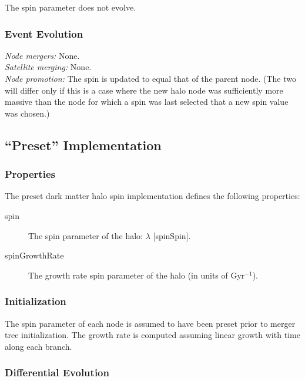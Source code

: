 The spin parameter does not evolve.

\subsubsection{Event Evolution}

\noindent\emph{Node mergers:} None.\\

\noindent\emph{Satellite merging:} None.\\

\noindent\emph{Node promotion:} The spin is updated to equal that of the parent node. (The two will differ only if this is a case where the new halo \gls{node} was sufficiently more massive than the \gls{node} for which a spin was last selected that a new spin value was chosen.)\\

\subsection{``Preset'' Implementation}

\subsubsection{Properties}

The preset dark matter halo spin implementation defines the following properties:
\begin{description}
 \item [{\normalfont \ttfamily spin}] The spin parameter of the halo: $\lambda$ [{\normalfont \ttfamily spinSpin}].
 \item [{\normalfont \ttfamily spinGrowthRate}] The growth rate spin parameter of the halo (in units of Gyr$^{-1}$).
\end{description}

\subsubsection{Initialization}

The spin parameter of each \gls{node} is assumed to have been preset prior to merger tree initialization. The growth rate is computed assuming linear growth with time along each branch.

\subsubsection{Differential Evolution}

